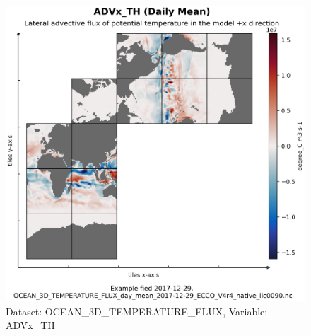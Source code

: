 \begin{figure}[H]
\centering
\includegraphics[scale=0.55]{../images/plots/native_plots/Ocean_Three-Dimensional_Potential_Temperature_Fluxes/ADVx_TH.png}
\caption{Dataset: OCEAN\_3D\_TEMPERATURE\_FLUX, Variable: ADVx\_TH}
\label{tab:table-OCEAN_3D_TEMPERATURE_FLUX_ADVx_TH-Plot}
\end{figure}
\pagebreak
